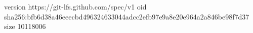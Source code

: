 version https://git-lfs.github.com/spec/v1
oid sha256:bfb6d38a46eeecbd496324633044adcc2efb97e9a8e20e964a2a846be98f7d37
size 10118006
